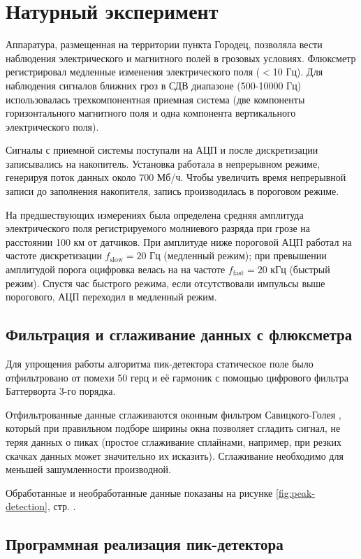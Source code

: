 \documentclass[a4paper,14pt]{extarticle}
\begin{document}
\newpage
\section{Натурный эксперимент}

Аппаратура, размещенная на территории пункта Городец, позволяла вести наблюдения электрического и магнитного полей в грозовых условиях. Флюксметр регистрировал медленные изменения электрического поля ($<$10 Гц). Для наблюдения сигналов ближних гроз в СДВ диапазоне (500-10000 Гц) использовалась трехкомпонентная приемная система (две компоненты горизонтального магнитного поля и одна компонента вертикального электрического поля). 


Сигналы с приемной системы поступали на АЦП и после дискретизации записывались на накопитель. Установка работала в непрерывном режиме, генерируя поток данных около $700$ Мб/ч. Чтобы увеличить время непрерывной записи до заполнения накопителя, запись производилась в пороговом режиме. 

На предшествующих измерениях была определена средняя амплитуда электрического поля регистрируемого молниевого разряда при грозе на расстоянии 100 км от датчиков. При амплитуде ниже пороговой АЦП работал на частоте дискретизации $f_\text{slow}=20$ Гц (медленный режим); при превышении амплитудой порога оцифровка велась на на частоте $f_\text{fast}=20$ кГц (быстрый режим). Спустя час быстрого режима, если отсутствовали импульсы выше порогового, АЦП переходил в медленный режим.


\subsection{Фильтрация и сглаживание данных с флюксметра}

Для упрощения работы алгоритма пик-детектора статическое поле 
было отфильтровано от помехи 50 герц и её гармоник с помощью цифрового фильтра Баттерворта 3-го порядка. 

Отфильтрованные данные сглаживаются оконным фильтром Савицкого-Голея , который при правильном подборе ширины окна позволяет сгладить сигнал, не теряя данных о пиках \cite{sav} (простое сглаживание сплайнами, например, при резких скачках данных может значительно их исказить). Сглаживание необходимо для меньшей зашумленности производной.

Обработанные и необработанные данные показаны на рисунке \ref{fig:peak-detection}, стр. \pageref{fig:peak-detection}.


\subsection{Программная реализация пик-детектора}
\end{document}
